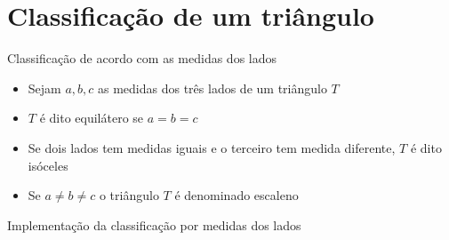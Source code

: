 \section{Classificação de um triângulo}

\begin{frame}[fragile]{Classificação de acordo com as medidas dos lados}

    \begin{itemize}
        \item Sejam $a, b, c$ as medidas dos três lados de um triângulo $T$

        \item $T$ é dito equilátero se $a = b = c$

        \item Se dois lados tem medidas iguais e o terceiro tem medida diferente, $T$ é dito
            isóceles

        \item Se $a \neq b\neq c$ o triângulo $T$ é denominado escaleno

    \end{itemize}

\end{frame}

\begin{frame}[fragile]{Implementação da classificação por medidas dos lados}
\end{frame}


